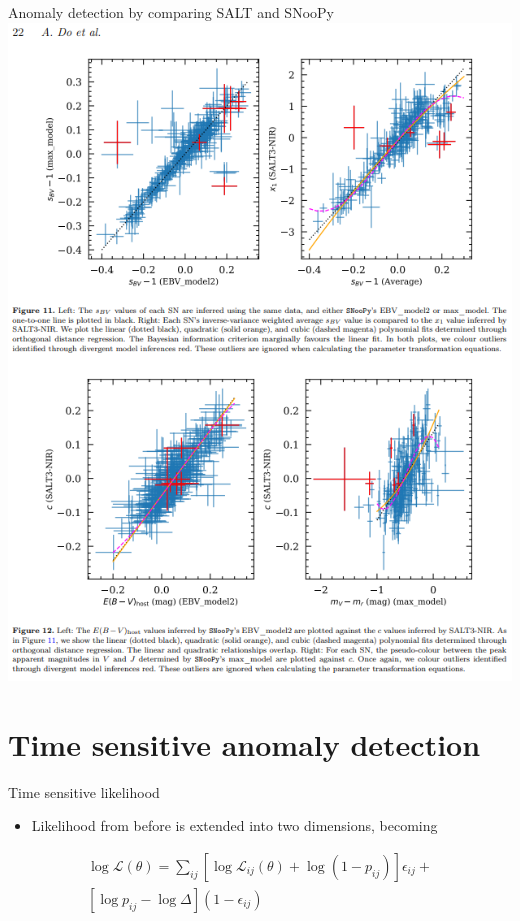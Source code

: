 \documentclass[aspectratio=169]{beamer}
\begin{document}
\begin{frame}{Anomaly detection by comparing SALT and SNooPy}
    \includegraphics[width=1\textwidth]{images/snoopyvssalt.png}
    \centering
\end{frame}



\section{Time sensitive anomaly detection}

\begin{frame}{Time sensitive likelihood}
    \begin{itemize}
    \item Likelihood from before is extended into two dimensions, becoming
    \end{itemize}
    \begin{multline}\label{eq:time_sep_flagged}
    \log \mathcal{L} \left(\theta\right) = \sum_{ij} \left[\log \mathcal{L}_{ij} \left(\theta\right) + \log\left(1-p_{ij}\right)\right]\epsilon_{ij} +
    \\
    \left[ \log p_{ij} - \log \Delta \right]\left(1-\epsilon_{ij}\right)
    \end{multline}
  \end{frame}
\end{document}
